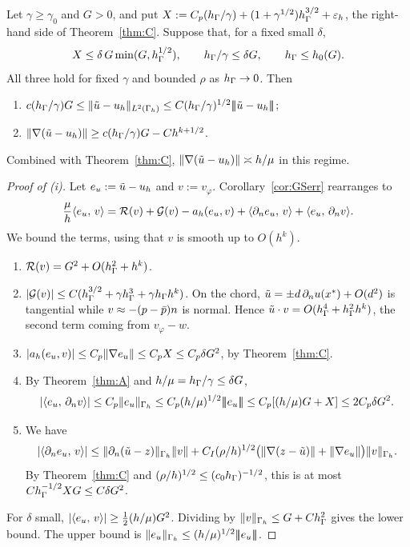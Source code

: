 \begin{theorem}\label{thm:B}
Let $\gamma\ge\gamma_0$ and $G>0$, and put $X:=C_p(h_\Gamma/\gamma)+(1+\gamma^{1/2})h_\Gamma^{3/2}+\varepsilon_h$, the right-hand side of Theorem~\ref{thm:C}. Suppose that, for a fixed small $\delta$,
\[
X\le\delta\,G\min(G,h_\Gamma^{1/2}),\qquad h_\Gamma/\gamma\le\delta G,\qquad h_\Gamma\le h_0(G).
\]
All three hold for fixed $\gamma$ and bounded $\rho$ as $h_\Gamma\to0$. Then
\begin{enumerate}[label=(\roman*)]
\item $c(h_\Gamma/\gamma)G\le\lVert \tilde u-u_h\rVert_{L^2(\Gamma_h)}\le C(h_\Gamma/\gamma)^{1/2}|\!|\!|\tilde u-u_h|\!|\!|$;
\item $\lVert \nabla(\tilde u-u_h)\rVert\ge c(h_\Gamma/\gamma)G-Ch^{k+1/2}$.
\end{enumerate}
Combined with Theorem~\ref{thm:C}, $\lVert \nabla(\tilde u-u_h)\rVert\asymp h/\mu$ in this regime.
\end{theorem}

\begin{proof}[Proof of (i)]
Let $e_u:=\tilde u-u_h$ and $v:=v_\varphi$. Corollary~\ref{cor:GSerr} rearranges to
\[
\frac\mu h\langle e_u,\, v\rangle=\mathcal R(v)+\mathcal G(v)-a_h(e_u,v)+\langle \partial_n e_u,\, v\rangle+\langle e_u,\, \partial_n v\rangle.
\]
We bound the terms, using that $v$ is smooth up to $O(h^k)$.
\begin{enumerate}
\item $\mathcal R(v)=G^2+O(h_\Gamma^2+h^k)$.
\item $|\mathcal G(v)|\le C(h_\Gamma^{3/2}+\gamma h_\Gamma^3+\gamma h_\Gamma h^k)$. On the chord, $\tilde u=\pm d\,\partial_n u(x^\ast)+O(d^2)$ is tangential while $v\approx-(p-\bar p)n$ is normal. Hence $\tilde u\cdot v=O(h_\Gamma^4+h_\Gamma^2h^k)$, the second term coming from $v_\varphi-w$.
\item $|a_h(e_u,v)|\le C_p\lVert \nabla e_u\rVert\le C_pX\le C_p\delta G^2$, by Theorem~\ref{thm:C}.
\item By Theorem~\ref{thm:A} and $h/\mu=h_\Gamma/\gamma\le\delta G$,
\[
|\langle e_u,\, \partial_n v\rangle|\le C_p\lVert e_u\rVert_{\Gamma_h}\le C_p(h/\mu)^{1/2}|\!|\!|e_u|\!|\!|\le C_p[(h/\mu)G+X]\le2C_p\delta G^2 .
\]
\item We have
\[
|\langle \partial_n e_u,\, v\rangle|\le\lVert \partial_n(\tilde u-z)\rVert_{\Gamma_h}\lVert v\rVert+C_I(\rho/h)^{1/2}\bigl(\lVert \nabla(z-\tilde u)\rVert+\lVert \nabla e_u\rVert\bigr)\lVert v\rVert_{\Gamma_h}.
\]
By Theorem~\ref{thm:C} and $(\rho/h)^{1/2}\le(c_0h_\Gamma)^{-1/2}$, this is at most $Ch_\Gamma^{-1/2}XG\le C\delta G^2$.
\end{enumerate}
For $\delta$ small, $|\langle e_u,\, v\rangle|\ge\frac12(h/\mu)G^2$. Dividing by $\lVert v\rVert_{\Gamma_h}\le G+Ch_\Gamma^2$ gives the lower bound. The upper bound is $\lVert e_u\rVert_{\Gamma_h}\le(h/\mu)^{1/2}|\!|\!|e_u|\!|\!|$.
\end{proof}

